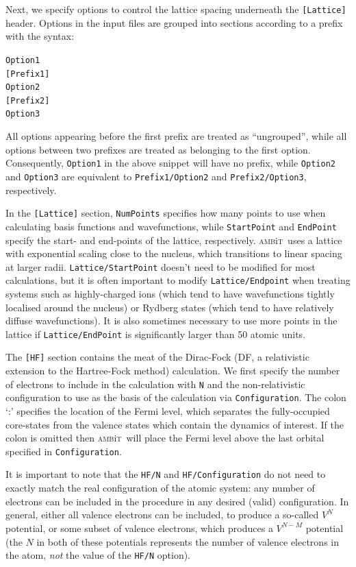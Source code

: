 \documentclass{report}
\newcommand{\ambit}{\textsc{amb}{\footnotesize i}\textsc{t}}
\begin{document}
Next, we specify options to control the lattice spacing underneath the \texttt{[Lattice]} header. 
Options in the input files are grouped into sections according to a prefix with the
syntax:

\texttt{Option1}\\
\texttt{[Prefix1]}\\
\texttt{Option2}\\
\texttt{[Prefix2]}\\
\texttt{Option3}

All options appearing before the first prefix are treated as ``ungrouped'', while all options between
two prefixes are treated as belonging to the first option. Consequently, \texttt{Option1} in the above
snippet will have no prefix, while \texttt{Option2} and \texttt{Option3} are equivalent to
\texttt{Prefix1/Option2} and \texttt{Prefix2/Option3}, respectively.

In the \texttt{[Lattice]} section, \texttt{NumPoints} specifies how many points to use when calculating
basis functions and wavefunctions, while \texttt{StartPoint} and \texttt{EndPoint} specify the start-
and end-points of the lattice, respectively. \ambit\  uses a lattice with exponential scaling close to
the nucleus, which transitions to linear spacing at larger radii. \texttt{Lattice/StartPoint} doesn't
need to be modified for most calculations, but it is often important to modify \texttt{Lattice/Endpoint}
when treating systems such as highly-charged ions (which tend to have wavefunctions tightly localised
around the nucleus) or Rydberg states (which tend to have relatively diffuse wavefunctions). It is also
sometimes necessary to use more points in the lattice if \texttt{Lattice/EndPoint} is significantly
larger than 50 atomic units.

The \texttt{[HF]} section contains the meat of the Dirac-Fock (DF, a relativistic extension to the
Hartree-Fock method) calculation. We first specify the number of electrons to include in the calculation
with \texttt{N} and the non-relativistic configuration to use as the basis of the calculation via
\texttt{Configuration}. The colon `:' specifies the location of the Fermi level, which separates the
fully-occupied core-states from the valence states which contain the dynamics of interest. If the colon
is omitted then \ambit\  will place the Fermi level above the last orbital specified in
\texttt{Configuration}.

It is important to note that the \texttt{HF/N} and \texttt{HF/Configuration} do not need to exactly
match the real configuration of the atomic system: any number of electrons can be included in the 
procedure in any desired (valid) configuration. In general, either all valence electrons can be
included, to produce a so-called $V^N$ potential, or some subset of valence electrons, which produces a
$V^{N-M}$ potential (the $N$ in both of these potentials represents the number of valence electrons in 
the atom, \emph{not} the value of the \texttt{HF/N} option).
\end{document}
